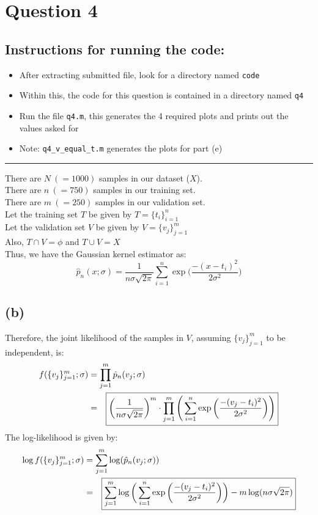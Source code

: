 \documentclass[11pt, fleqn]{article}
\begin{document}
\newpage
\section*{Question 4}
\setcounter{equation}{0}
\setcounter{figure}{0}
\subsection*{Instructions for running the code:}
\begin{itemize}[itemsep=-0.6ex]
    \item After extracting submitted file, look for a directory named \texttt{code}
    \item Within this, the code for this question is contained in a directory named \texttt{q4}
    \item Run the file \texttt{q4.m}, this generates the 4 required plots and prints out the values asked for
    \item Note: \texttt{q4\_v\_equal\_t.m} generates the plots for part (e)
\end{itemize}
\hrule
\vspace{15pt}
There are $N\ (=1000)$ samples in our dataset ($X$). \\
There are $n\ (=750)$ samples in our training set. \\
There are $m\ (=250)$ samples in our validation set. \\
Let the training set $T$ be given by $T = \{t_i\}_{i=1}^n$ \\
Let the validation set $V$ be given by $V = \{v_j\}_{j=1}^m$ \\
Also, $T\cap V = \phi$ and $T \cup V = X$ \\
Thus, we have the Gaussian kernel estimator as: \\
$$
\hat p_n(x;\sigma) = \frac{1}{n\sigma\sqrt{2\pi}} \sum_{i=1}^{n}\exp\bigg(\frac{-(x - t_i)^2}{2\sigma^2} \bigg)
$$
\subsection*{(b)}
Therefore, the joint likelihood of the samples in $V$, assuming $\{v_j\}_{j=1}^{m}$ to be independent, is:
$$
\begin{aligned}
    f(\{v_j\}_{j=1}^{m}; \sigma) &= \prod_{j=1}^m \hat p_n(v_j;\sigma)\\
    &= \Aboxed{\bigg(\frac{1}{n\sigma\sqrt{2\pi}}\bigg)^m\cdot \prod_{j=1}^m\Bigg( \sum_{i=1}^{n}\exp\bigg(\frac{-(v_j - t_i)^2}{2\sigma^2} \bigg) \Bigg)}
\end{aligned}
$$
The log-likelihood is given by:
$$
\begin{aligned}
    \log f(\{v_j\}_{j=1}^{m}; \sigma) &= \sum_{j=1}^m \log (\hat p_n(v_j;\sigma))\\
    &= \Aboxed{\sum_{j=1}^m \log \bigg(\sum_{i=1}^{n}\exp\bigg(\frac{-(v_j - t_i)^2}{2\sigma^2} \bigg)\bigg) - m\log(n\sigma\sqrt{2\pi})}
\end{aligned}
$$
\end{document}
